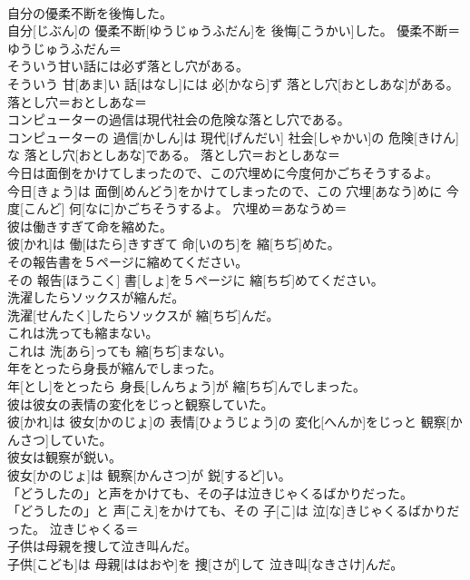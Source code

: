 \documentclass[8pt]{extreport}
\begin{document}
\begin{CJK}{UTF8}{min}
{\\	自分の優柔不断を後悔した。	
\\	自分[じぶん]の 優柔不断[ゆうじゅうふだん]を 後悔[こうかい]した。	優柔不断＝ゆうじゅうふだん＝ 
\\	そういう甘い話には必ず落とし穴がある。	
\\	そういう 甘[あま]い 話[はなし]には 必[かなら]ず 落とし穴[おとしあな]がある。	落とし穴＝おとしあな＝ 
\\	コンピューターの過信は現代社会の危険な落とし穴である。	
\\	コンピューターの 過信[かしん]は 現代[げんだい] 社会[しゃかい]の 危険[きけん]な 落とし穴[おとしあな]である。	落とし穴＝おとしあな＝ 
\\	今日は面倒をかけてしまったので、この穴埋めに今度何かごちそうするよ。	
\\	今日[きょう]は 面倒[めんどう]をかけてしまったので、この 穴埋[あなう]めに 今度[こんど] 何[なに]かごちそうするよ。	穴埋め＝あなうめ＝ 
\\	彼は働きすぎて命を縮めた。	
\\	彼[かれ]は 働[はたら]きすぎて 命[いのち]を 縮[ちぢ]めた。	
\\	その報告書を５ページに縮めてください。	
\\	その 報告[ほうこく] 書[しょ]を５ページに 縮[ちぢ]めてください。	
\\	洗濯したらソックスが縮んだ。	
\\	洗濯[せんたく]したらソックスが 縮[ちぢ]んだ。	
\\	これは洗っても縮まない。	
\\	これは 洗[あら]っても 縮[ちぢ]まない。	
\\	年をとったら身長が縮んでしまった。	
\\	年[とし]をとったら 身長[しんちょう]が 縮[ちぢ]んでしまった。	
\\	彼は彼女の表情の変化をじっと観察していた。	
\\	彼[かれ]は 彼女[かのじょ]の 表情[ひょうじょう]の 変化[へんか]をじっと 観察[かんさつ]していた。	
\\	彼女は観察が鋭い。	
\\	彼女[かのじょ]は 観察[かんさつ]が 鋭[するど]い。	
\\	「どうしたの」と声をかけても、その子は泣きじゃくるばかりだった。	
\\	「どうしたの」と 声[こえ]をかけても、その 子[こ]は 泣[な]きじゃくるばかりだった。	泣きじゃくる＝ 
\\	子供は母親を捜して泣き叫んだ。	
\\	子供[こども]は 母親[ははおや]を 捜[さが]して 泣き叫[なきさけ]んだ。	
}
\end{CJK}
\end{document}
